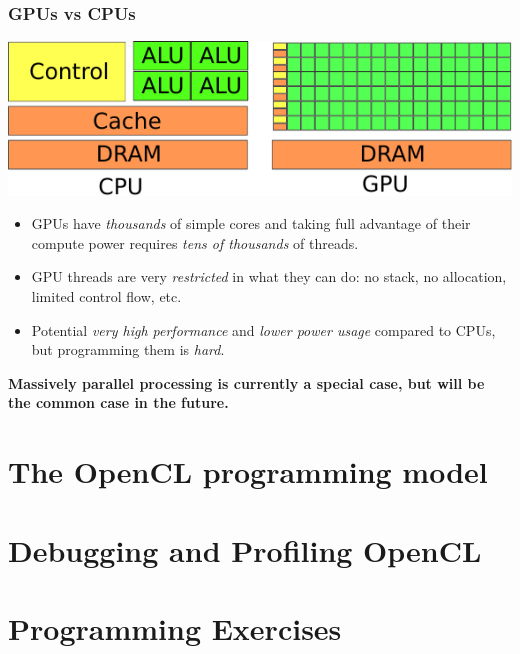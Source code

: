 \documentclass{beamer}
\begin{document}
\begin{frame}
  \frametitle{GPUs vs CPUs}

  \includegraphics[width=\textwidth]{img/cpu-gpu-architecture.pdf}

  \begin{itemize}
  \item GPUs have \textit{thousands} of simple cores and taking full
    advantage of their compute power requires \textit{tens of
      thousands} of threads.
  \item GPU threads are very \textit{restricted} in what they can do:
    no stack, no allocation, limited control flow, etc.
  \item Potential \textit{very high performance} and \textit{lower
      power usage} compared to CPUs, but programming them is
    \textit{hard}.
  \end{itemize}

  \textbf{Massively parallel processing is currently a special case,
    but will be the common case in the future.}
\end{frame}

\section{The OpenCL programming model}

\begin{frame}
	\tableofcontents[currentsection]
\end{frame}

\section{Debugging and Profiling OpenCL}

\begin{frame}
	\tableofcontents[currentsection]
\end{frame}

\section{Programming Exercises}

\begin{frame}
	\tableofcontents[currentsection]
\end{frame}
\end{document}
